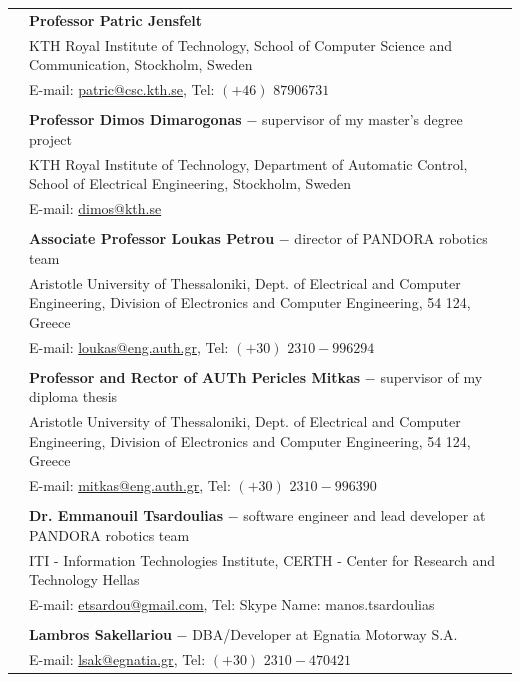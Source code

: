\documentclass[a4paper,10pt,twoside]{article}
\begin{document}
\begin{tabular}{rp{14cm}}
& \textbf{Professor Patric Jensfelt}\\
&KTH Royal Institute of Technology, School of Computer Science and Communication, Stockholm, Sweden \\
& E-mail: \href{mailto: patric@csc.kth.se}{patric@csc.kth.se}, Tel: $(+46)$ $8 790 67 31$ \\
&\\
& \textbf{Professor Dimos Dimarogonas} $-$ supervisor of my master's degree project\\
&KTH Royal Institute of Technology, Department of Automatic Control, School of Electrical Engineering, Stockholm, Sweden \\
& E-mail: \href{mailto: dimos@kth.se}{dimos@kth.se} \\
&\\
& \textbf{Associate Professor Loukas Petrou} $-$ director of PANDORA robotics team\\
&Aristotle University of Thessaloniki, Dept. of Electrical and Computer Engineering,
Division of Electronics and Computer Engineering, 54 124, Greece \\
& E-mail: \href{mailto: loukas@eng.auth.gr}{loukas@eng.auth.gr}, Tel: $(+30)$ $2310-996294$ \\
&\\
& \textbf{Professor and Rector of AUTh Pericles Mitkas} $-$ supervisor of my diploma thesis\\
&Aristotle University of Thessaloniki, Dept. of Electrical and Computer Engineering,
Division of Electronics and Computer Engineering, 54 124, Greece \\
& E-mail: \href{mailto:mitkas@eng.auth.gr}{mitkas@eng.auth.gr}, Tel: $(+30)$ $2310-996390$ \\
&\\
& \textbf{Dr. Emmanouil Tsardoulias} $-$ software engineer and lead developer at PANDORA robotics team\\
& ITI - Information Technologies Institute, CERTH - Center for Research and Technology Hellas \\
& E-mail: \href{mailto:etsardou@gmail.com}{etsardou@gmail.com}, Tel: Skype Name: manos.tsardoulias \\
&\\
& \textbf{Lambros Sakellariou} $-$ DBA/Developer at Egnatia Motorway S.A.\\
& E-mail: \href{mailto:lsak@egnatia.gr}{lsak@egnatia.gr}, Tel: $(+30)$ $2310 - 470421$ \\

\end{tabular}
\end{document}
